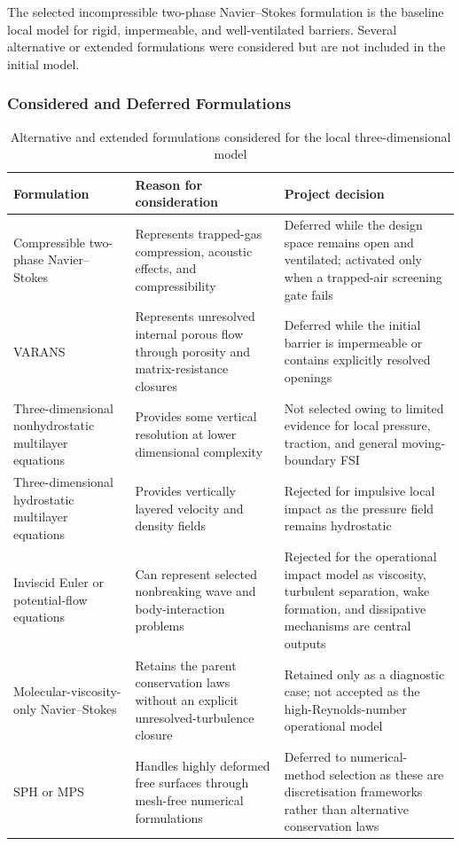 The selected incompressible two-phase Navier--Stokes formulation is the
baseline local model for rigid, impermeable, and well-ventilated
barriers. Several alternative or extended formulations were considered
but are not included in the initial model.

\subsubsection{Considered and Deferred Formulations}
\label{sec:res-mod-asm-local-considered-formulations}

\begin{table}[htbp]
  \centering
  \small
  \renewcommand{\arraystretch}{1.25}
  \begin{tabular}{
      p{}
      p{}
      p{}
    }
    \hline
    Formulation
    &
    Reason for consideration
    &
    Project decision
    \\
    \hline
    Compressible two-phase Navier--Stokes
    &
    Represents trapped-gas compression, acoustic effects, and
    compressibility
    &
    Deferred while the design space remains open and ventilated;
    activated only when a trapped-air screening gate fails
    \\
    VARANS
    &
    Represents unresolved internal porous flow through porosity and
    matrix-resistance closures
    &
    Deferred while the initial barrier is impermeable or contains
    explicitly resolved openings
    \\
    Three-dimensional nonhydrostatic multilayer equations
    &
    Provides some vertical resolution at lower dimensional
    complexity
    &
    Not selected owing to limited evidence for local pressure,
    traction, and general moving-boundary FSI
    \\
    Three-dimensional hydrostatic multilayer equations
    &
    Provides vertically layered velocity and density fields
    &
    Rejected for impulsive local impact as the pressure field
    remains hydrostatic
    \\
    Inviscid Euler or potential-flow equations
    &
    Can represent selected nonbreaking wave and body-interaction
    problems
    &
    Rejected for the operational impact model as viscosity,
    turbulent separation, wake formation, and dissipative
    mechanisms are central outputs
    \\
    Molecular-viscosity-only Navier--Stokes
    &
    Retains the parent conservation laws without an explicit
    unresolved-turbulence closure
    &
    Retained only as a diagnostic case; not accepted as the
    high-Reynolds-number operational model
    \\
    SPH or MPS
    &
    Handles highly deformed free surfaces through mesh-free
    numerical formulations
    &
    Deferred to numerical-method selection as these are
    discretisation frameworks rather than alternative conservation
    laws
    \\
    \hline
  \end{tabular}
  \caption{Alternative and extended formulations considered for the
  local three-dimensional model}
  \label{tab:res-mod-asm-local-considered-formulations}
\end{table}

